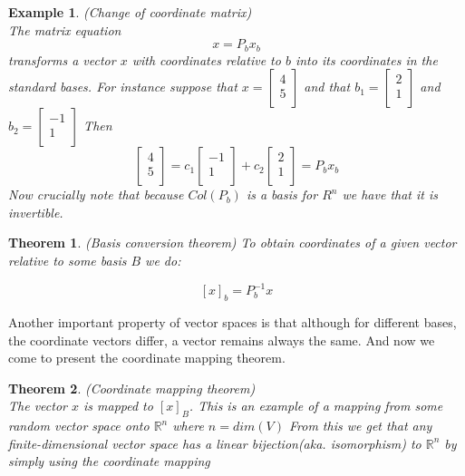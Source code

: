 \documentclass[titlepage]{article}
\newtheorem{thm}{Theorem}[subsection]
\newtheorem{exm}{Example}[subsection]
\numberwithin{equation}{subsection}
\begin{document}
\begin{exm}
(Change of coordinate matrix)
\\
The matrix equation 
$$ x = P_{b}x_{b}$$
transforms a vector $x$ with coordinates relative to $b$ into its coordinates in the standard bases. For instance suppose that $x = \begin{bmatrix}
    4 \\
    5\\
\end{bmatrix}$ and that $b_{1} = \begin{bmatrix}
    2 \\
    1 \\
\end{bmatrix}$ and $b_{2} = \begin{bmatrix}
    -1 \\
    1 \\
\end{bmatrix}$ Then $$ \begin{bmatrix}
    4 \\
    5\\
\end{bmatrix} =  c_{1}\begin{bmatrix}
    -1 \\
    1 \\
\end{bmatrix} + c_{2}\begin{bmatrix}
    2 \\
    1 \\
\end{bmatrix} = P_{b}x_{b} $$
Now crucially note that because $Col(P_{b})$ is a basis for $R^{n}$ we have that it is invertible.
\end{exm}

\begin{thm}(Basis conversion theorem)
To obtain coordinates of a given vector relative to some basis $B$ we do:

$$ [x]_{b} = P^{-1}_{b}x$$
\end{thm}

Another important property of vector spaces is that although for different bases, the coordinate vectors differ, a vector remains always the same. And now we come to present the coordinate mapping theorem. 

\begin{thm}(Coordinate mapping theorem)
\\ 
The vector $x$ is mapped to $[x]_{B}$. This is an example of a mapping from some random vector space onto $\mathbb{R}^n$ where $n = dim(V)$ From this we get that any finite-dimensional vector space has a linear bijection(aka. isomorphism) to $\mathbb{R}^n$ by simply using the coordinate mapping
\end{thm}
\end{document}
